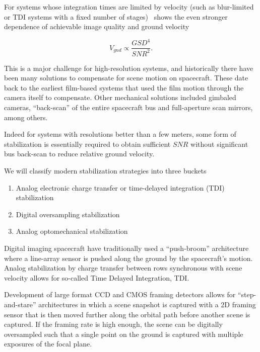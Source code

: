 \documentclass[]{spieman}  %
\begin{document}
For systems whose integration times are limited by velocity (such as blur-limited or TDI systems with a fixed number of stages)~\cite{shaw} shows the   even stronger dependence of achievable image quality and ground velocity

\begin{equation*}
V_{gnd} \propto \frac{GSD^4}{SNR^2}.
\end{equation*}

This is a major challenge for high-resolution systems, and historically there have been many solutions to compensate for scene motion on spacecraft.  These date back to the earliest film-based systems that used the film motion through the camera itself to compensate.  Other mechanical solutions included gimbaled cameras, ``back-scan'' of the entire spacecraft bus and full-aperture scan mirrors, among others.

Indeed for systems with resolutions better than a few meters, some form of stabilization is essentially required to obtain sufficient $SNR$ without significant bus back-scan to reduce relative ground velocity.

We will classify modern stabilization strategies into three  buckets

\begin{enumerate}
\item Analog electronic charge transfer or time-delayed integration (TDI) stabilization
\item Digital oversampling stabilization
\item Analog optomechanical stabilization
\end{enumerate}

Digital imaging spacecraft have traditionally used a ``push-broom'' architecture where a line-array sensor is pushed along the ground by the spacecraft's motion.  Analog stabilization by charge transfer between rows synchronous with scene velocity allows for so-called Time Delayed Integration, TDI.  

Development of large format CCD and CMOS framing detectors allows for ``step-and-stare'' architectures in which a scene snapshot is captured with a 2D framing sensor that is then moved further along the orbital path before another scene is captured.  If the framing rate is high enough, the scene can be digitally oversampled such that a single point on the ground is captured with multiple exposures of the focal plane.
\end{document}
